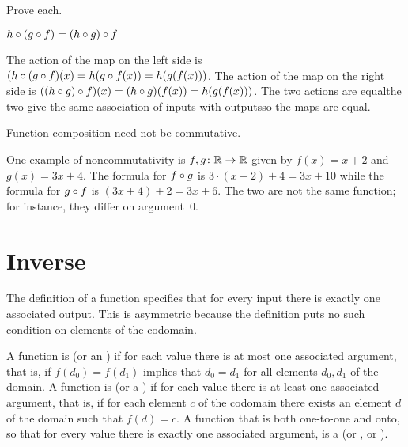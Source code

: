 \documentclass{ibl}  %
\begin{document}
\begin{problem} Prove each.
\begin{exes}
\begin{exercise}
  $h\mathbin{\circ} (g\mathbin{\circ} f)=(h\mathbin{\circ} g)\mathbin{\circ} f$    
\end{exercise}
\begin{answer}
  The action of the map on the left side
  is $(h\mathbin{\circ} (g\mathbin{\circ} f)(x)=h(g\mathbin{\circ} f(x))
       =h(g(f(x)))$.
  The action of the map on the right side  
  is $((h\mathbin{\circ} g)\mathbin{\circ} f)(x)=(h\mathbin{\circ} g)(f(x))
      =h(g(f(x)))$.
  The two actions are equal\Dash the two give the same association of inputs
  with outputs\Dash so the maps are equal.  
\end{answer}
\begin{exercise} 
  Function composition need not be commutative.
\end{exercise}
\begin{answer}
  One example of noncommutativity is $\mbox{$f,g\colon \mathbb{R}\to \mathbb{R}$}$ given by 
  $f(x)=x+2$ and $g(x)=3x+4$.
  The formula for $f\mathbin{\circ} g$ is $3\cdot(x+2)+4=3x+10$ while
  the formula for $g\mathbin{\circ} f$ is $(3x+4)+2=3x+6$.
  The two are not the same function; 
  for instance, they differ on argument~$0$.  
\end{answer}
\end{exes}
\end{problem}





\section{Inverse}

The definition of a function specifies that for every input 
there is exactly one associated output.
This is asymmetric because the 
definition puts no such condition on elements of the codomain.

\begin{df}
A function is  (or an ) 
if for each value there is at most
one associated argument, that is, if $f(d_0)=f(d_1)$ implies that $d_0=d_1$
for all elements $d_0,d_1$ of the domain.
A function is  (or a ) 
if for each value there is at least
one associated argument, that is, if for each element $c$ of the codomain
there exists an element $d$ of the domain such that $f(d)=c$.
A function that is both one-to-one and onto, so that for every value there
is exactly one associated argument, is a 
 (or , or ).
\end{df}
\end{document}
